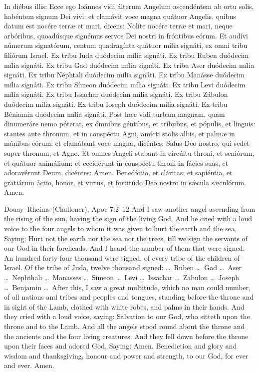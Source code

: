 \begin{latinproper}
In diébus illis: Ecce ego Ioánnes vidi álterum Angelum ascendéntem ab ortu
solis, habéntem signum Dei vivi: et clamávit voce magna quátuor Angelis,
quibus datum est nocére terræ et mari, dicens: Nolíte nocére terræ et mari,
neque arbóribus, quoadúsque signémus servos Dei nostri in fróntibus eórum.
Et audívi númerum signatórum, centum quadragínta quátuor mília signáti, ex
omni tribu filiórum Israel. Ex tribu Iuda duódecim mília signáti. Ex tribu
Ruben duódecim mília signáti. Ex tribu Gad duódecim mília signáti. Ex tribu
Aser duódecim mília signáti. Ex tribu Néphtali duódecim mília signáti. Ex
tribu Manásse duódecim mília signáti. Ex tribu Símeon duódecim mília
signáti. Ex tribu Levi duódecim mília signáti. Ex tribu Issachar duódecim
mília signáti. Ex tribu Zábulon duódecim mília signáti. Ex tribu Ioseph
duódecim mília signáti. Ex tribu Béniamin duódecim mília signáti. Post hæc
vidi turbam magnam, quam dinumeráre nemo póterat, ex ómnibus géntibus, et
tríbubus, et pópulis, et linguis: stantes ante thronum, et in conspéctu
Agni, amícti stolis albis, et palmæ in mánibus eórum: et clamábant voce
magna, dicéntes: Salus Deo nostro, qui sedet super thronum, et Agno. Et
omnes Angeli stabant in circúitu throni, et seniórum, et quátuor
animálium: et cecidérunt in conspéctu throni in fácies suas, et
adoravérunt Deum, dicéntes: Amen. Benedíctio, et cláritas, et sapiéntia, et
gratiárum áctio, honor, et virtus, et fortitúdo Deo nostro in sǽcula
sæculórum. Amen.
\end{latinproper}

\begin{englishwitness}{Douay--Rheims (Challoner), Apoc 7:2--12}
And I saw another angel ascending from the rising of the sun, having the sign
of the living God. And he cried with a loud voice to the four angels to whom
it was given to hurt the earth and the sea, Saying: Hurt not the earth nor the
sea nor the trees, till we sign the servants of our God in their foreheads.
And I heard the number of them that were signed. An hundred forty-four
thousand were signed, of every tribe of the children of Israel. Of the tribe
of Juda, twelve thousand signed: \dots\ Ruben \dots\ Gad \dots\ Aser \dots\
Nephthali \dots\ Manasses \dots\ Simeon \dots\ Levi \dots\ Issachar \dots\
Zabulon \dots\ Joseph \dots\ Benjamin \dots\ After this, I saw a great
multitude, which no man could number, of all nations and tribes and peoples
and tongues, standing before the throne and in sight of the Lamb, clothed with
white robes, and palms in their hands. And they cried with a loud voice,
saying: Salvation to our God, who sitteth upon the throne and to the Lamb. And
all the angels stood round about the throne and the ancients and the four
living creatures. And they fell down before the throne upon their faces and
adored God, Saying: Amen. Benediction and glory and wisdom and thanksgiving,
honour and power and strength, to our God, for ever and ever. Amen.
\end{englishwitness}

